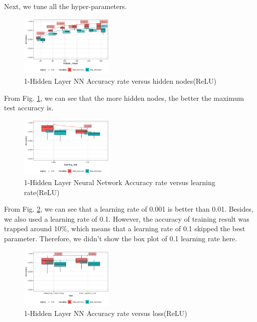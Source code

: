 \documentclass[conference]{IEEEtran}
\begin{document}
Next, we tune all the hyper-parameters.
\begin{figure}[htbp]
\centerline{\includegraphics[width=0.4\textwidth]{figure/91-Hidden Layer Neural Network Accuracy rate versus hidden_nodes.png}}
\caption{1-Hidden Layer NN Accuracy rate versus hidden nodes(ReLU)}
\label{1-Hidden Layer Neural Network Accuracy rate versus hidden nodes(ReLU)}
\end{figure}
From Fig. \ref{1-Hidden Layer Neural Network Accuracy rate versus hidden nodes(ReLU)}, we can see that the more hidden nodes, the better the maximum test accuracy is.
\begin{figure}[htbp]
\centerline{\includegraphics[width=0.4\textwidth]{figure/91-Hidden Layer Neural Network Accuracy rate versus learning_rate.png}}
\caption{1-Hidden Layer Neural Network Accuracy rate versus learning rate(ReLU)}
\label{1-Hidden Layer Neural Network Accuracy rate versus learning rate(ReLU)}
\end{figure}
From Fig. \ref{1-Hidden Layer Neural Network Accuracy rate versus learning rate(ReLU)}, we can see that a learning rate of 0.001 is better than 0.01. Besides, we also used a learning rate of 0.1. However, the accuracy of training result was trapped around 10\%, which means that a learning rate of 0.1 skipped the best parameter. Therefore, we didn't show the box plot of 0.1 learning rate here.
\begin{figure}[htbp]
\centerline{\includegraphics[width=0.4\textwidth]{figure/91-Hidden Layer Neural Network Accuracy rate versus loss.png}}
\caption{1-Hidden Layer NN Accuracy rate versus loss(ReLU)}
\label{1-Hidden Layer Neural Network Accuracy rate versus loss(ReLU)}
\end{figure}
\end{document}
